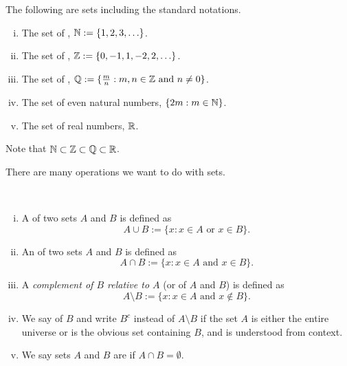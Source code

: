 \begin{example}
The following are sets including the standard notations.
\begin{enumerate}[(i)]
\item The set of \emph{},
${\mathbb{N}} := \{ 1, 2, 3, \ldots
\}$.
\item The set of \emph{},
${\mathbb{Z}} := \{ 0, -1, 1, -2, 2, \ldots
\}$.
\item The set of \emph{},
${\mathbb{Q}} := \{ \frac{m}{n} :  m, n \in {\mathbb{Z}}
\text{ and } n \not= 0 \}$.
\item The set of even natural numbers, $\{  2m : m \in {\mathbb{N}} \}$.
\item The set of real numbers,
${\mathbb{R}}$.
\end{enumerate}

Note that ${\mathbb{N}} \subset {\mathbb{Z}} \subset {\mathbb{Q}} \subset {\mathbb{R}}$.
\end{example}

There are many operations we want to do with sets.

\begin{defn}
{\ }
\begin{enumerate}[(i)]
\item
A \emph{} of two sets $A$ and $B$ is defined as
\begin{equation*}
A \cup B := \{ x : x \in A \text{ or } x \in B \} .
\end{equation*}
\item
An \emph{} of two sets $A$ and $B$ is defined as
\begin{equation*}
A \cap B := \{ x : x \in A \text{ and } x \in B \} .
\end{equation*}
\item
A \emph{complement of $B$ relative to $A$}
(or \emph{} of $A$ and $B$) is defined as
\begin{equation*}
A \setminus B := \{ x : x \in A \text{ and } x \notin B \} .
\end{equation*}
\item
We say
\emph{} of $B$ and write $B^c$ 
instead of $A \setminus B$ if
the set $A$ is either the entire universe or is the obvious
set containing $B$, and is understood from context.
\item
We say sets $A$ and $B$ are \emph{} if $A \cap B =
\emptyset$.
\end{enumerate}
\end{defn}

